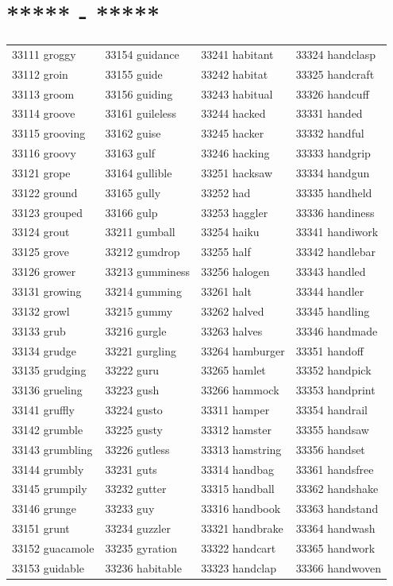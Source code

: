 \documentclass[10pt, oneside]{book}
\begin{document}
\begin{table}[h]
	\centering
	\section*{***** - *****}
	\begin{tabular}{l l l l}
33111 groggy &33154 guidance &33241 habitant &33324 handclasp\\
33112 groin &33155 guide &33242 habitat &33325 handcraft\\
33113 groom &33156 guiding &33243 habitual &33326 handcuff\\
33114 groove &33161 guileless &33244 hacked &33331 handed\\
33115 grooving &33162 guise &33245 hacker &33332 handful\\
33116 groovy &33163 gulf &33246 hacking &33333 handgrip\\
33121 grope &33164 gullible &33251 hacksaw &33334 handgun\\
33122 ground &33165 gully &33252 had &33335 handheld\\
33123 grouped &33166 gulp &33253 haggler &33336 handiness\\
33124 grout &33211 gumball &33254 haiku &33341 handiwork\\
33125 grove &33212 gumdrop &33255 half &33342 handlebar\\
33126 grower &33213 gumminess &33256 halogen &33343 handled\\
33131 growing &33214 gumming &33261 halt &33344 handler\\
33132 growl &33215 gummy &33262 halved &33345 handling\\
33133 grub &33216 gurgle &33263 halves &33346 handmade\\
33134 grudge &33221 gurgling &33264 hamburger &33351 handoff\\
33135 grudging &33222 guru &33265 hamlet &33352 handpick\\
33136 grueling &33223 gush &33266 hammock &33353 handprint\\
33141 gruffly &33224 gusto &33311 hamper &33354 handrail\\
33142 grumble &33225 gusty &33312 hamster &33355 handsaw\\
33143 grumbling &33226 gutless &33313 hamstring &33356 handset\\
33144 grumbly &33231 guts &33314 handbag &33361 handsfree\\
33145 grumpily &33232 gutter &33315 handball &33362 handshake\\
33146 grunge &33233 guy &33316 handbook &33363 handstand\\
33151 grunt &33234 guzzler &33321 handbrake &33364 handwash\\
33152 guacamole &33235 gyration &33322 handcart &33365 handwork\\
33153 guidable &33236 habitable &33323 handclap &33366 handwoven\\
	\end{tabular}
 \end{table}
\end{document}
